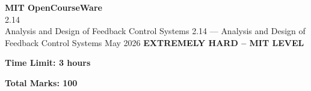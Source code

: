 \documentclass[12pt,a4paper]{exam}
\begin{document}
\begin{center}
{\LARGE \textbf{MIT OpenCourseWare}}\\2.14\\Analysis and Design of Feedback Control Systems
\vspace{0.5cm}
{2.14} --- {Analysis and Design of Feedback Control Systems}
\vspace{0.3cm}
May 2026
\vspace{0.3cm}
\textbf{EXTREMELY HARD -- MIT LEVEL}
\end{center}

\begin{center}
\textbf{Time Limit: 3 hours}
\end{center}

\begin{center}
\textbf{Total Marks: 100}
\end{center}

\vspace{0.5cm}
\end{document}
